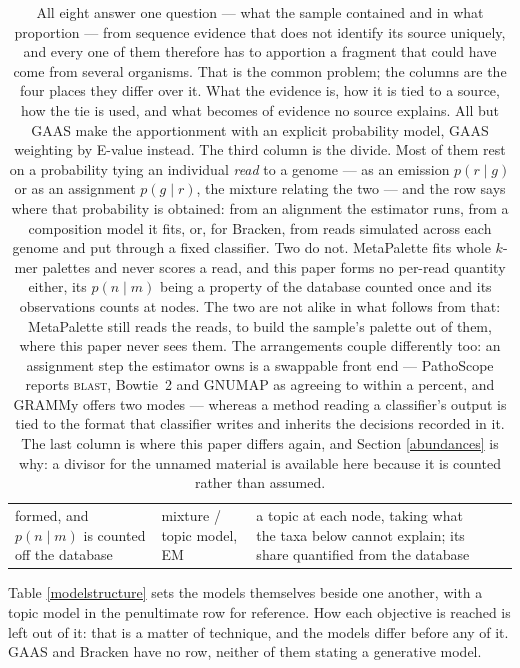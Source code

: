\documentclass[pdflatex,sn-vancouver-num]{sn-jnl}
\begin{document}
\begin{table}[!htbp]
\begin{tabular}{@{}l|p{2.0cm}|p{2.2cm}|p{2.6cm}|p{3.0cm}@{}}
                formed, and $p(n \mid m)$ is counted off the database &
                mixture / topic model, EM & a topic at each node, taking what the taxa below cannot
                explain; its share quantified from the database\\
        \end{tabular}
        \caption{All eight answer one question --- what the sample contained and in what proportion ---
        from sequence evidence that does not identify its source uniquely, and every one of them
        therefore has to apportion a fragment that could have come from several organisms. That is
        the common problem; the columns are the four places they differ over it. What the evidence is,
        how it is tied to a source, how the tie is used, and what becomes of evidence no source
        explains. All but GAAS make the apportionment with an explicit probability model, GAAS
        weighting by E-value instead. The third
        column is the divide. Most of them rest on a probability tying an individual \emph{read} to a
        genome --- as an emission $p(r \mid g)$ or as an assignment $p(g \mid r)$, the mixture
        relating the two --- and the row says where that probability is obtained: from an alignment
        the estimator runs, from a composition model it fits, or, for Bracken, from reads simulated
        across each genome and put through a fixed classifier. Two do not. MetaPalette fits whole
        $k$-mer palettes and never scores a read, and this paper forms no per-read quantity either,
        its $p(n \mid m)$ being a property of the database counted once and its observations counts
        at nodes. The two are not alike in what follows from that: MetaPalette still reads the reads,
        to build the sample's palette out of them, where this paper never sees them.
        The arrangements couple differently too: an assignment step the estimator owns is a swappable
        front end --- PathoScope reports
        \textsc{blast}, Bowtie~2 and GNUMAP as agreeing to within a percent, and GRAMMy offers two
        modes --- whereas a method reading a classifier's output is tied to the format that
        classifier writes and inherits the decisions recorded in it. The last column is where this
        paper differs again, and Section \ref{abundances} is why: a divisor for the unnamed material
        is available here because it is counted rather than assumed.}\label{priorwork}
    \end{table}

    Table \ref{modelstructure} sets the models themselves beside one another, with a topic model in
    the penultimate row for reference. How each objective is reached is left out of it: that is a matter of
    technique, and the models differ before any of it. GAAS and Bracken have no row, neither of them
    stating a generative model.
\end{document}
